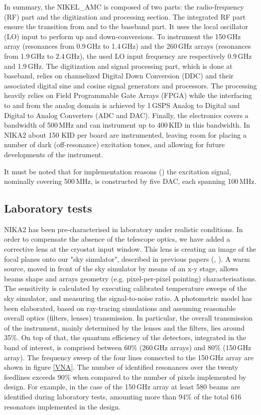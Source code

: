 \documentclass[]{aa} %
\begin{document}
In summary, the NIKEL\_AMC is composed of two parts: the radio-frequency (RF)
part and the digitization and processing section.  The integrated RF part ensure
the transition from and to the baseband part.  It uses the local oscillator (LO)
input to perform up and down-conversions.  To instrument the 150\,GHz array
(resonances from 0.9\,GHz to 1.4\,GHz) and the 260\,GHz arrays (resonances from
1.9\,GHz to 2.4\,GHz), the used LO input frequency are respectively 0.9\,GHz and
1.9\,GHz. The digitization and signal processing part, which is done at
baseband, relies on channelized Digital Down Conversion (DDC) and their
associated digital sine and cosine signal generators and processors.  The
processing heavily relies on Field Programmable Gate Arrays (FPGA) while the
interfacing to and from the analog domain is achieved by 1\,GSPS Analog to
Digital and Digital to Analog Converters (ADC and DAC).  Finally, the
electronics covers a bandwidth of 500\,MHz and can instrument up to 400\,KID in
this bandwidth. In NIKA2 about 150 KID per board are instrumented, leaving room
for placing a number of dark (off-resonance) excitation tones, and allowing for
future developments of the instrument.

It must be noted that for implementation reasons
(\cite{Bourrion2012,Bourrion2016}) the excitation signal, nominally covering
500\,MHz, is constructed by five DAC, each spanning 100\,MHz.



\subsection{Laboratory tests}
\label{Laboratory tests}

NIKA2 has been pre-characterised in laboratory under realistic conditions. In
order to compensate the absence of the telescope optics, we have added a
corrective lens at the cryostat input window. This lens is creating an image of
the focal planes onto our "sky simulator", described in previous papers
(\cite{Catalano2014}, \cite{Monfardini2011}). A warm source, moved in front of
the sky simulator by means of an x-y stage, allows beams shape and arrays
geometry (e.g. pixel-per-pixel pointing) characterisations. The sensitivity is
calculated by executing calibrated temperature sweeps of the sky simulator, and
measuring the signal-to-noise ratio. A photometric model has been elaborated,
based on ray-tracing simulations and assuming reasonable overall optics
(filters, lenses) transmission. In particular, the overall transmission of the
instrument, mainly determined by the lenses and the filters, lies around
35\%. On top of that, the quantum efficiency of the detectors, integrated in the
band of interest, is comprised between 60\% (260\,GHz arrays) and 80\% (150\,GHz
array). The frequency sweep of the four lines connected to the 150\,GHz array
are shown in figure \ref{VNA}. The number of identified resonances over the
twenty feedlines exceeds 90\% when compared to the number of pixels implemented
by design. For example, in the case of the 150\,GHz array at least 580 beams are
identified during laboratory tests, amounting more than 94\% of the total 616
resonators implemented in the design.
\end{document}
